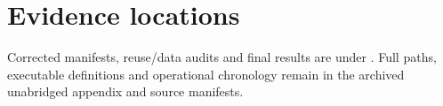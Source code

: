 \section{Evidence locations}

Corrected manifests, reuse/data audits and final results are under . Full paths, executable definitions and operational chronology remain in the archived unabridged appendix and source manifests.




